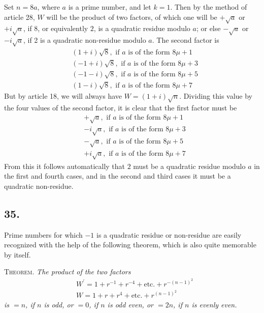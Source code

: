 \documentclass[twoside,12pt]{memoir}
\begin{document}
Set \(n=8a\), where \(a\) is a prime number, and let \(k=1\). Then by the method of article 28, \(W\) will be the product of two factors, of which one will be \(+\sqrt{a}\) or \(+i\sqrt{a}\), if \(8\), or equivalently \(2\), is a quadratic residue modulo \(a\); or else \(-\sqrt{a}\) or \(-i\sqrt{a}\), if 2 is a quadratic non-residue modulo \(a\). The second factor is 
\[\begin{aligned}
& (1+i)\sqrt{8}, \text{ if } a \text{ is of the form } 8\mu+1 \\
& (-1+i)\sqrt{8}, \text{ if } a \text{ is of the form } 8\mu+3 \\
& (-1-i)\sqrt{8}, \text{ if } a \text{ is of the form } 8\mu+5 \\
& (1-i)\sqrt{8}, \text{ if } a \text{ is of the form } 8\mu+7
\end{aligned}\]
But by article 18, we will always have \(W=(1+i)\sqrt{n}\). Dividing this value by the four values of the second factor, it is clear that the first factor must be
\[\begin{aligned}
& +\sqrt{a}, \text{ if } a \text{ is of the form } 8\mu+1 \\
& -i\sqrt{a}, \text{ if } a \text{ is of the form } 8\mu+3 \\
& -\sqrt{a}, \text{ if } a \text{ is of the form } 8\mu+5 \\
& +i\sqrt{a}, \text{ if } a \text{ is of the form } 8\mu+7
\end{aligned}\]
From this it follows automatically that \(2\) must be a quadratic residue modulo \(a\) in the first and fourth cases, and in the second and third cases it must be a quadratic non-residue.\pagebreak%

\subsection*{35.}

Prime numbers for which \(-1\) is a quadratic residue or non-residue are easily recognized with the help of the following theorem, which is also quite memorable by itself.

\textsc{Theorem.} \textit{The product of the two factors}
\[\begin{aligned}
& W^{\prime}=1+r^{-1}+r^{-4}+\text{etc{.}}+r^{-(n-1)^{2}} \\
& W=1+r+r^{4}+\text{etc{.}}+r^{(n-1)^{2}}
\end{aligned}\]
\textit{is \(=n\), if \(n\) is odd, or \(=0\), if \(n\) is odd even, or \(=2 n\), if \(n\) is evenly even.}
\end{document}
